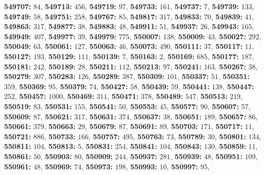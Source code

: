 \textsf{\bfseries 549707:} $84$, \textsf{\bfseries 549713:} $456$, \textsf{\bfseries 549719:} $97$, \textsf{\bfseries 549733:} $161$, \textsf{\bfseries 549737:} $7$, \textsf{\bfseries 549739:} $133$, \textsf{\bfseries 549749:} $58$, \textsf{\bfseries 549751:} $258$, \textsf{\bfseries 549767:} $85$, \textsf{\bfseries 549817:} $317$, \textsf{\bfseries 549833:} $70$, \textsf{\bfseries 549839:} $41$, \textsf{\bfseries 549863:} $317$, \textsf{\bfseries 549877:} $38$, \textsf{\bfseries 549883:} $48$, \textsf{\bfseries 549911:} $51$, \textsf{\bfseries 549937:} $26$, \textsf{\bfseries 549943:} $165$, \textsf{\bfseries 549949:} $407$, \textsf{\bfseries 549977:} $39$, \textsf{\bfseries 549979:} $775$, \textsf{\bfseries 550007:} $138$, \textsf{\bfseries 550009:} $43$, \textsf{\bfseries 550027:} $292$, \textsf{\bfseries 550049:} $63$, \textsf{\bfseries 550061:} $127$, \textsf{\bfseries 550063:} $46$, \textsf{\bfseries 550073:} $490$, \textsf{\bfseries 550111:} $37$, \textsf{\bfseries 550117:} $11$, \textsf{\bfseries 550127:} $193$, \textsf{\bfseries 550129:} $111$, \textsf{\bfseries 550139:} $7$, \textsf{\bfseries 550163:} $2$, \textsf{\bfseries 550169:} $685$, \textsf{\bfseries 550177:} $187$, \textsf{\bfseries 550181:} $242$, \textsf{\bfseries 550189:} $28$, \textsf{\bfseries 550211:} $112$, \textsf{\bfseries 550213:} $97$, \textsf{\bfseries 550241:} $163$, \textsf{\bfseries 550267:} $38$, \textsf{\bfseries 550279:} $307$, \textsf{\bfseries 550283:} $126$, \textsf{\bfseries 550289:} $387$, \textsf{\bfseries 550309:} $101$, \textsf{\bfseries 550337:} $51$, \textsf{\bfseries 550351:} $359$, \textsf{\bfseries 550369:} $95$, \textsf{\bfseries 550379:} $74$, \textsf{\bfseries 550427:} $58$, \textsf{\bfseries 550439:} $59$, \textsf{\bfseries 550441:} $138$, \textsf{\bfseries 550447:} $252$, \textsf{\bfseries 550457:} $1000$, \textsf{\bfseries 550469:} $311$, \textsf{\bfseries 550471:} $378$, \textsf{\bfseries 550489:} $547$, \textsf{\bfseries 550513:} $219$, \textsf{\bfseries 550519:} $83$, \textsf{\bfseries 550531:} $155$, \textsf{\bfseries 550541:} $50$, \textsf{\bfseries 550553:} $45$, \textsf{\bfseries 550577:} $90$, \textsf{\bfseries 550607:} $57$, \textsf{\bfseries 550609:} $87$, \textsf{\bfseries 550621:} $317$, \textsf{\bfseries 550631:} $374$, \textsf{\bfseries 550637:} $38$, \textsf{\bfseries 550651:} $189$, \textsf{\bfseries 550657:} $86$, \textsf{\bfseries 550661:} $379$, \textsf{\bfseries 550663:} $29$, \textsf{\bfseries 550679:} $87$, \textsf{\bfseries 550691:} $89$, \textsf{\bfseries 550703:} $171$, \textsf{\bfseries 550717:} $11$, \textsf{\bfseries 550721:} $886$, \textsf{\bfseries 550733:} $166$, \textsf{\bfseries 550757:} $495$, \textsf{\bfseries 550763:} $73$, \textsf{\bfseries 550789:} $30$, \textsf{\bfseries 550801:} $134$, \textsf{\bfseries 550811:} $104$, \textsf{\bfseries 550813:} $5$, \textsf{\bfseries 550831:} $254$, \textsf{\bfseries 550841:} $104$, \textsf{\bfseries 550843:} $130$, \textsf{\bfseries 550859:} $11$, \textsf{\bfseries 550861:} $50$, \textsf{\bfseries 550903:} $80$, \textsf{\bfseries 550909:} $244$, \textsf{\bfseries 550937:} $281$, \textsf{\bfseries 550939:} $48$, \textsf{\bfseries 550951:} $109$, \textsf{\bfseries 550961:} $48$, \textsf{\bfseries 550969:} $74$, \textsf{\bfseries 550973:} $198$, \textsf{\bfseries 550993:} $10$, \textsf{\bfseries 550997:} $95$, 
